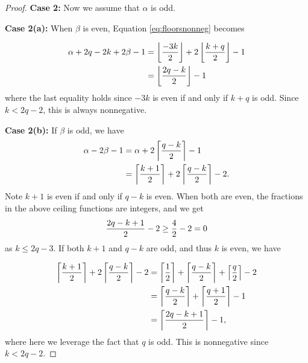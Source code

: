 \documentclass[10pt,a4paper]{amsart}
\begin{document}
\begin{proof}
\noindent \textbf{Case 2:} Now we assume that $\alpha$ is odd. 

\noindent\textbf{Case 2(a):}
When $\beta$ is even, Equation \ref{eq:floorsnonneg} becomes

\begin{align*}
\alpha+2q-2k+2\beta-1
&=\left\lfloor{-3k\over 2}\right\rfloor +2\left\lfloor {k+q\over 2}\right\rfloor-1\\
&=\left\lfloor{2q-k\over 2}\right\rfloor-1
\end{align*}
where the last equality holds since $-3k$ is even if and only if $k+q$ is odd. Since $k<2q-2$, this is always nonnegative. 

\noindent \textbf{Case 2(b):} If $\beta$ is odd, we have 
\begin{align*}
\alpha-2\beta-1&=\alpha+2\left\lceil {q-k\over 2}\right\rceil -1\\
&=\left\lceil{k+1\over 2}\right\rceil+2\left\lceil {q-k\over 2}\right\rceil -2.
\end{align*}
Note $k+1$ is even if and only if $q-k$ is even. When both are even, the fractions in the above ceiling functions are integers, and we get
\[{2q-k+1\over 2}-2\geq {4\over 2}-2=0\]
as $k\leq 2q-3$. If both $k+1$ and $q-k$ are odd, and thus $k$ is even, we have



\begin{align*}
\left\lceil{k+1\over 2}\right\rceil+2\left\lceil {q-k\over 2}\right\rceil -2&=\left\lceil {1\over 2}\right\rceil+\left\lceil {q-k\over 2}\right \rceil+\left\lceil {q\over 2}\right \rceil-2\\
&=\left\lceil {q-k\over 2}\right \rceil+\left\lceil{q+1\over 2}\right\rceil -1\\
&=\left\lceil {2q-k+1\over 2}\right \rceil -1,
\end{align*}
where here we leverage the fact that $q$ is odd. This is nonnegative since $k<2q-2$.



\end{proof}
\end{document}

